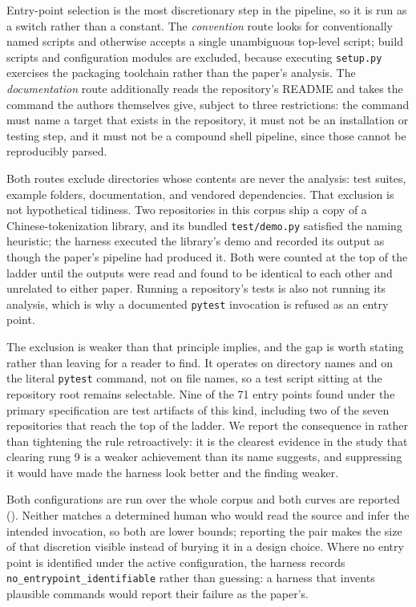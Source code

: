 Entry-point selection is the most discretionary step in the pipeline, so it is
run as a switch rather than a constant. The \emph{convention} route looks for
conventionally named scripts and otherwise accepts a single unambiguous top-level
script; build scripts and configuration modules are excluded, because executing
\texttt{setup.py} exercises the packaging toolchain rather than the paper's
analysis. The \emph{documentation} route additionally reads the repository's
README and takes the command the authors themselves give, subject to three
restrictions: the command must name a target that exists in the repository, it
must not be an installation or testing step, and it must not be a compound shell
pipeline, since those cannot be reproducibly parsed.

Both routes exclude directories whose contents are never the analysis: test
suites, example folders, documentation, and vendored dependencies. That exclusion
is not hypothetical tidiness. Two repositories in this corpus ship a copy of a
Chinese-tokenization library, and its bundled \texttt{test/demo.py} satisfied the
naming heuristic; the harness executed the library's demo and recorded its output
as though the paper's pipeline had produced it. Both were counted at the top of
the ladder until the outputs were read and found to be identical to each other
and unrelated to either paper. Running a repository's tests is also not running
its analysis, which is why a documented \texttt{pytest} invocation is refused as
an entry point.

The exclusion is weaker than that principle implies, and the gap is worth stating
rather than leaving for a reader to find. It operates on directory names and on
the literal \texttt{pytest} command, not on file names, so a test script sitting
at the repository root remains selectable. Nine of the 71 entry points found
under the primary specification are test artifacts of this kind, including two of
the seven repositories that reach the top of the ladder. We report the
consequence in  rather than tightening the rule
retroactively: it is the clearest evidence in the study that clearing rung 9 is a
weaker achievement than its name suggests, and suppressing it would have made the
harness look better and the finding weaker.

Both configurations are run over the whole corpus and both curves are reported
(). Neither matches a determined human who would read the
source and infer the intended invocation, so both are lower bounds; reporting the
pair makes the size of that discretion visible instead of burying it in a design
choice. Where no entry point is identified under the active configuration, the
harness records \texttt{no\_entrypoint\_identifiable} rather than guessing: a
harness that invents plausible commands would report their failure as the
paper's.

